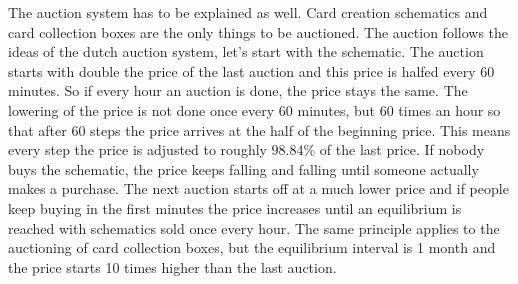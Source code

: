 \documentclass{article}
\begin{document}
%
\newline\newline
%
The auction system has to be explained as well. Card creation schematics and card collection boxes are the only things to be auctioned. The auction follows the ideas of the dutch auction system, let's start with the schematic. The auction starts with double the price of the last auction and this price is halfed every 60 minutes. So if every hour an auction is done, the price stays the same. The lowering of the price is not done once every 60 minutes, but 60 times an hour so that after 60 steps the price arrives at the half of the beginning price. This means every step the price is adjusted to roughly 98.84\% of the last price. If nobody buys the schematic, the price keeps falling and falling until someone actually makes a purchase. The next auction starts off at a much lower price and if people keep buying in the first minutes the price increases until an equilibrium is reached with schematics sold once every hour. The same principle applies to the auctioning of card collection boxes, but the equilibrium interval is 1 month and the price starts 10 times higher than the last auction.
%
\end{document}
